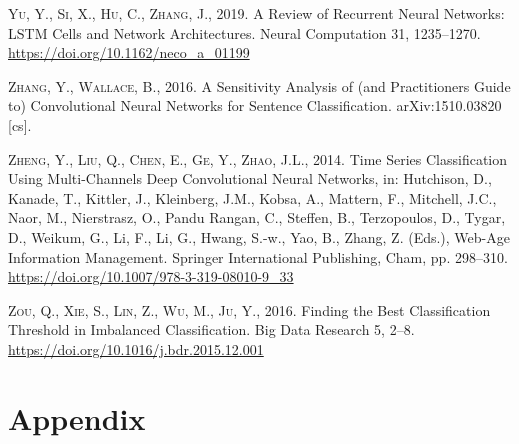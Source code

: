 \documentclass[a4paper,11pt]{article}
\begin{document}
\leavevmode\hypertarget{ref-yu2019}{}%
\textsc{Yu, Y., Si, X., Hu, C., Zhang, J.}, 2019. A Review of Recurrent Neural Networks: LSTM Cells and Network Architectures. Neural Computation 31, 1235--1270. \url{https://doi.org/10.1162/neco_a_01199}

\leavevmode\hypertarget{ref-zhanga}{}%
\textsc{Zhang, Y., Wallace, B.}, 2016. A Sensitivity Analysis of (and Practitioners Guide to) Convolutional Neural Networks for Sentence Classification. arXiv:1510.03820 {[}cs{]}.

\leavevmode\hypertarget{ref-zheng2014}{}%
\textsc{Zheng, Y., Liu, Q., Chen, E., Ge, Y., Zhao, J.L.}, 2014. Time Series Classification Using Multi-Channels Deep Convolutional Neural Networks, in: Hutchison, D., Kanade, T., Kittler, J., Kleinberg, J.M., Kobsa, A., Mattern, F., Mitchell, J.C., Naor, M., Nierstrasz, O., Pandu Rangan, C., Steffen, B., Terzopoulos, D., Tygar, D., Weikum, G., Li, F., Li, G., Hwang, S.-w., Yao, B., Zhang, Z. (Eds.), Web-Age Information Management. Springer International Publishing, Cham, pp. 298--310. \url{https://doi.org/10.1007/978-3-319-08010-9_33}

\leavevmode\hypertarget{ref-zou2016}{}%
\textsc{Zou, Q., Xie, S., Lin, Z., Wu, M., Ju, Y.}, 2016. Finding the Best Classification Threshold in Imbalanced Classification. Big Data Research 5, 2--8. \url{https://doi.org/10.1016/j.bdr.2015.12.001}

\indent
\setlength{\parindent}{17pt}
\setlength{\leftskip}{0pt}
\setlength{\parskip}{0pt}

\newpage

\appendix

\hypertarget{appendix}{%
\section{Appendix}\label{appendix}}

\renewcommand{\thefigure}{A\arabic{figure}} \setcounter{figure}{0}
\renewcommand{\thetable}{A\arabic{table}} \setcounter{table}{0}
\renewcommand{\theequation}{A\arabic{table}} \setcounter{equation}{0}
\setcounter{page}{1}
\end{document}
